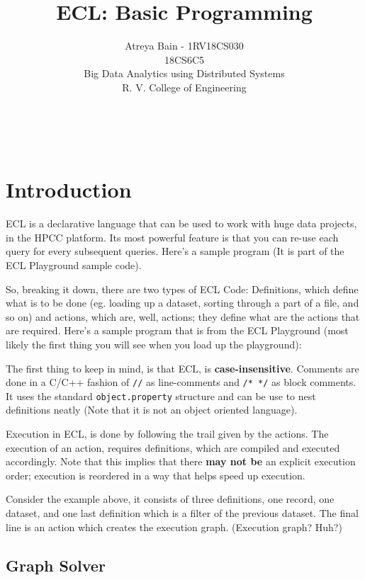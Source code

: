 \documentclass[a4paper,oneside,12pt]{book}
\title{ECL: Basic Programming}
\author{Atreya Bain - 1RV18CS030\\18CS6C5\\Big Data Analytics using Distributed Systems\\R. V. College of Engineering}
\begin{document}
\maketitle{}%
\tableofcontents
\
\pagebreak

\chapter{Introduction}

ECL is a declarative language that can be used to work with huge data projects, in the HPCC platform. Its most powerful feature is that you can re-use each query for every subsequent queries. Here's a sample program (It is part of the ECL Playground sample code).

So, breaking it down, there are two types of ECL Code: Definitions, which define what is to be done (eg. loading up a dataset, sorting through a part of a file, and so on) and actions, which are, well, actions; they define what are the actions that are required. Here's a sample program that is from the ECL Playground (most likely the first thing you will see when you load up the playground):



The first thing to keep in mind, is that ECL, is \textbf{case-insensitive}. Comments are done in a C/C++ fashion of \lstinline!//! as line-comments and \lstinline!/* */! as block comments. It uses the standard \lstinline!object.property! structure and can be use to nest definitions neatly (Note that it is not an object oriented language).

Execution in ECL, is done by following the trail given by the actions. The execution of an action, requires definitions, which are compiled and executed accordingly. Note that this implies that there \textbf{may not be} an explicit execution order; execution is reordered in a way that helps speed up execution.

Consider the example above, it consists of three definitions, one record, one dataset, and one last definition which is a filter of the previous dataset.
The final line is an action which creates the execution graph. (Execution graph? Huh?)

\section{Graph Solver}
\end{document}
